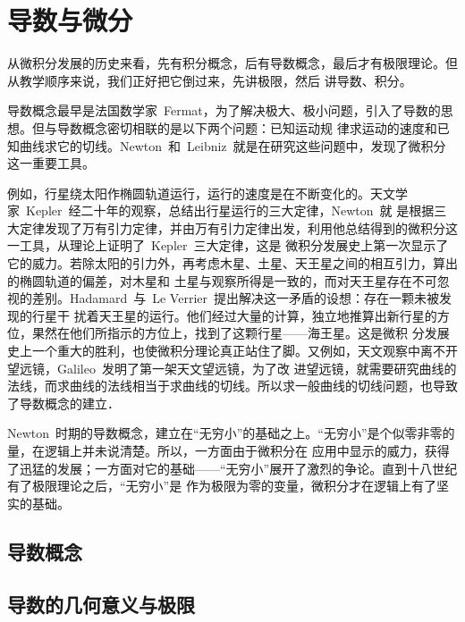 

\chapter{导数与微分}\label{ch:4}

从微积分发展的历史来看，先有积分概念，后有导数概念，最后才有极限理论。但从教学顺序来说，我们正好把它倒过来，先讲极限，然后
讲导数、积分。

导数概念最早是法国数学家~Fermat，为了解决极大、极小问题，引入了导数的思想。但与导数概念密切相联的是以下两个问题：已知运动规
律求运动的速度和已知曲线求它的切线。Newton~和~Leibniz~就是在研究这些问题中，发现了微积分这一重要工具。

例如，行星绕太阳作椭圆轨道运行，运行的速度是在不断变化的。天文学家~Kepler~经二十年的观察，总结出行星运行的三大定律，Newton~就
是根据三大定律发现了万有引力定律，并由万有引力定律出发，利用他总结得到的微积分这一工具，从理论上证明了~Kepler~三大定律，这是
微积分发展史上第一次显示了它的威力。若除太阳的引力外，再考虑木星、土星、天王星之间的相互引力，算出的椭圆轨道的偏差，对木星和
土星与观察所得是一致的，而对天王星存在不可忽视的差别。Hadamard~与~Le Verrier~提出解决这一矛盾的设想：存在一颗未被发现的行星干
扰着天王星的运行。他们经过大量的计算，独立地推算出新行星的方位，果然在他们所指示的方位上，找到了这颗行星——海王星。这是微积
分发展史上一个重大的胜利，也使微积分理论真正站住了脚。又例如，天文观察中离不开望远镜，Galileo~发明了第一架天文望远镜，为了改
进望远镜，就需要研究曲线的法线，而求曲线的法线相当于求曲线的切线。所以求一般曲线的切线问题，也导致了导数概念的建立．

Newton~时期的导数概念，建立在“无穷小”的基础之上。“无穷小”是个似零非零的量，在逻辑上并未说清楚。所以，一方面由于微积分在
应用中显示的威力，获得了迅猛的发展；一方面对它的基础——“无穷小”展开了激烈的争论。直到十八世纪有了极限理论之后，“无穷小”是
作为极限为零的变量，微积分才在逻辑上有了坚实的基础。


\section{导数概念}
\begin{exercise}
\item
\end{exercise}
\section{导数的几何意义与极限}
\begin{exercise}
\item
\end{exercise}
